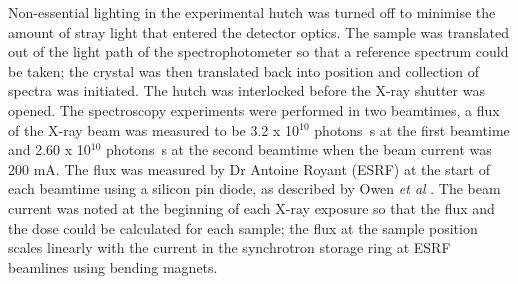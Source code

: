 Non-essential lighting in the experimental hutch was turned off to minimise the amount of stray light that entered the detector optics. The sample was translated out of the light path of the spectrophotometer so that a reference spectrum could be taken; the crystal was then translated back into position and collection of spectra was initiated. The hutch was interlocked before the X-ray shutter was opened. The spectroscopy experiments were performed in two beamtimes, a flux of the X-ray beam was measured to be 3.2 x 10$^{10}$ photons\si{\per\second} at the first beamtime and 2.60 x 10$^{10}$ photons\si{\per\second} at the second beamtime when the beam current was 200 \si{\milli\ampere}. The flux was measured by Dr Antoine Royant (ESRF) at the start of each beamtime using a silicon pin diode, as described by Owen \textit{et al} \cite{Owen2009}. The beam current was noted at the beginning of each X-ray exposure so that the flux and the dose could be calculated for each sample; the flux at the sample position scales linearly with the current in the synchrotron storage ring at ESRF beamlines using bending magnets.   
%
%


